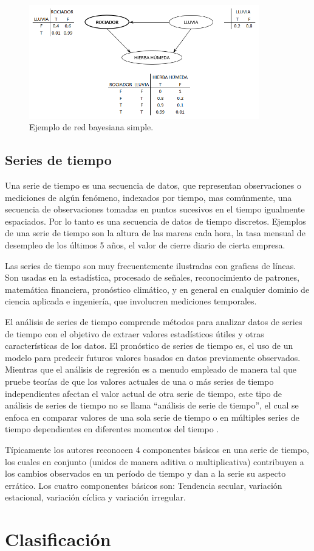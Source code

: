 \begin{figure}[h!]
	\centering
	\includegraphics[width=10cm]{img/redBayesianaEjemplo.png}
	\caption{Ejemplo de red bayesiana simple.}
	\label{fig:redBayesianaEjemplo}
\end{figure}

\subsection{Series de tiempo}
Una serie de tiempo es una secuencia de datos, que representan observaciones o mediciones de algún fenómeno, indexados por tiempo, mas comúnmente, una secuencia de observaciones tomadas en puntos sucesivos en el tiempo igualmente espaciados. Por lo tanto es una secuencia de datos de tiempo discretos. 
Ejemplos de una serie de tiempo son la altura de las mareas cada hora, la tasa mensual de desempleo de los últimos 5 años, el valor de cierre diario de cierta empresa.

Las series de tiempo son muy frecuentemente ilustradas con graficas de líneas. 
Son usadas en la estadística, procesado de señales, reconocimiento de patrones, matemática financiera, pronóstico climático, y en general en cualquier dominio de ciencia aplicada e ingeniería, que involucren mediciones temporales.

El análisis de series de tiempo comprende métodos para analizar datos de series de tiempo con el objetivo de extraer valores estadísticos útiles y otras características de los datos. 
El pronóstico de series de tiempo es, el uso de un modelo para predecir futuros valores basados en datos previamente observados. 
Mientras que el análisis de regresión es a menudo empleado de manera tal que pruebe teorías de que los valores actuales de una o más series de tiempo independientes afectan el valor actual de otra serie de tiempo, este tipo de análisis de series de tiempo no se llama
``análisis de serie de tiempo'', el cual se enfoca en comparar valores de una sola serie de tiempo o en múltiples series de tiempo dependientes en diferentes momentos del tiempo \cite{MImdadullahTimeSeriesAnalysis}.

Típicamente los autores reconocen 4 componentes básicos en una serie de tiempo, los cuales en conjunto (unidos de manera aditiva o multiplicativa) contribuyen a los cambios observados en un período de tiempo y dan a la serie su aspecto errático.
Los cuatro componentes básicos son: Tendencia secular, variación estacional, variación cíclica y variación irregular.

\section{Clasificación}


